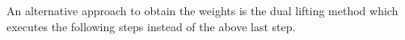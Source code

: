 An alternative approach to obtain the weights is the dual lifting method which executes the following steps instead of the above last step.

